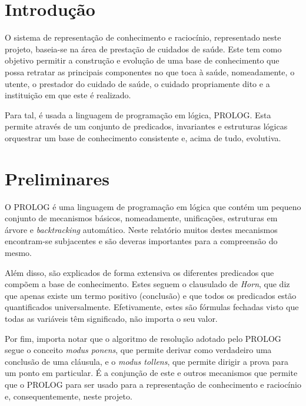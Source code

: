 \documentclass[a4paper]{article}
\begin{document}
\newpage

\tableofcontents

\newpage

\section{Introdução}

\hspace{3mm} O sistema de representação de conhecimento e raciocínio, representado neste projeto, baseia-se na área de prestação de cuidados de saúde. Este tem como objetivo permitir a construção e evolução de uma base de conhecimento que possa retratar as principais componentes no que toca à saúde, nomeadamente, o utente, o prestador do cuidado de saúde, o cuidado propriamente dito e a instituição em que este é realizado.

Para tal, é usada a linguagem de programação em lógica, PROLOG. Esta permite através de um conjunto de predicados, invariantes e estruturas lógicas orquestrar um base de conhecimento consistente e, acima de tudo, evolutiva.

\section{Preliminares}

\hspace{3mm} O PROLOG é uma linguagem de programação em lógica que contém um pequeno conjunto de mecanismos básicos, nomeadamente, unificações, estruturas em árvore e \textit{backtracking} automático. Neste relatório muitos destes mecanismos encontram-se subjacentes e são deveras importantes para a compreensão do mesmo. \cite{Bratko:1990:PPA:533072}

Além disso, são explicados de forma extensiva os diferentes predicados que compõem a base de conhecimento. Estes seguem o clausulado de \textit{Horn}, que diz que apenas existe um termo positivo (conclusão) e que todos os predicados estão quantificados universalmente. Efetivamente, estes são fórmulas fechadas visto que todas as variáveis têm significado, não importa o seu valor.

Por fim, importa notar que o algoritmo de resolução adotado pelo PROLOG segue o conceito \textit{modus ponens}, que permite derivar como verdadeiro uma conclusão de uma cláusula, e o \textit{modus tollens}, que permite dirigir a prova para um ponto em particular. É a conjunção de este e outros mecanismos que permite que o PROLOG para ser usado para a representação de conhecimento e raciocínio e, consequentemente, neste projeto.
\end{document}
